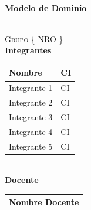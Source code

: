 \documentclass[10pt,spanish]{article}
\newcommand{\Titulo}{Modelo de Dominio}
\newcommand{\Grupo}{Grupo \{ NRO \}}
\newcommand{\NomIntegrUno}{Integrante 1}
\newcommand{\CiIntegrUno}{CI}
\newcommand{\NomIntegrDos}{Integrante 2}
\newcommand{\CiIntegrDos}{CI}
\newcommand{\NomIntegrTres}{Integrante 3}
\newcommand{\CiIntegrTres}{CI}
\newcommand{\NomIntegrCuatro}{Integrante 4}
\newcommand{\CiIntegrCuatro}{CI}
\newcommand{\NomIntegrCinco}{Integrante 5}
\newcommand{\CiIntegrCinco}{CI}
\newcommand{\NomDocente}{Nombre Docente}
\numberwithin{figure}{section} %
\begin{document}
\begin{center}
\vspace*{1cm}																		%
\HRule \\[0.4cm]																	%
{ \huge \bfseries \Titulo}\\[0.3cm]	%
\HRule \\[4cm]																	%
\begin{minipage}{0.8\textwidth}													%
\begin{flushleft} \large															%
\textsc{\LARGE \Grupo}\\
\LARGE{\textbf{Integrantes}}\\	
\Large
\vspace{0.3cm}
  \begin{tabular}{ | p{10cm} | p{2.5cm} | }
    \hline
    \textbf{Nombre} & \textbf{CI} \\ \hline
    \NomIntegrUno & \CiIntegrUno \\ \hline
    \NomIntegrDos & \CiIntegrDos  \\ \hline 
    \NomIntegrTres & \CiIntegrTres \\ \hline
    \NomIntegrCuatro & \CiIntegrCuatro \\ \hline
    \NomIntegrCinco & \CiIntegrCinco \\ \hline
  \end{tabular}\\[0.5cm]
\LARGE{\textbf{Docente}}\\	
\Large
\vspace{0.3cm}
\begin{tabular}{ | p{10cm} |}
    \hline
     \NomDocente \\ 
     \hline
  \end{tabular}
\end{flushleft}																		%
\end{minipage}		
\begin{minipage}{0.52\textwidth}		
\vspace{-0.6cm}											%
\begin{flushright} \large															%
\emph{} \\																	%
\end{flushright}																	%
\end{minipage}	
\begin{flushleft}
 	
\end{flushleft}
 		\flushleft{\textbf{}	}\\																		%
\end{center}							 											
																					
\end{document}
